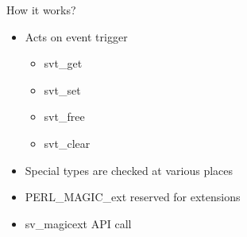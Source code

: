 \documentclass[mathserif,hyperref={urlcolor=cyan,colorlinks=true}]{beamer}
\begin{document}
\begin{frame}{How it works?}
\begin{itemize}
\item<1-> Acts on event trigger
    \begin{itemize}
    \item<2-> svt{\_}get
    \item<2-> svt{\_}set
    \item<2-> svt{\_}free
    \item<2-> svt{\_}clear
    \end{itemize}
\item<3-> Special types are checked at various places
\item<4-> PERL{\_}MAGIC{\_}ext reserved for extensions
\item<5-> sv{\_}magicext API call
\end{itemize}
\end{frame}
\end{document}
